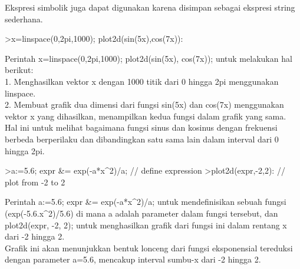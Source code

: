 \documentclass{article}
\begin{document}
\begin{eulernotebook}
\begin{eulercomment}
\begin{eulercomment}
\begin{eulercomment}
\begin{eulercomment}
\begin{eulercomment}
Ekspresi simbolik juga dapat digunakan karena disimpan sebagai
ekspresi string sederhana.
\end{eulercomment}
\begin{eulerprompt}
>x=linspace(0,2pi,1000); plot2d(sin(5x),cos(7x)):
\end{eulerprompt}
\begin{eulercomment}
Perintah x=linspace(0,2pi,1000); plot2d(sin(5x), cos(7x)); untuk
melakukan hal berikut:\\
1. Menghasilkan vektor x dengan 1000 titik dari 0 hingga 2pi
menggunakan linspace.\\
2. Membuat grafik dua dimensi dari fungsi sin(5x) dan cos(7x)
menggunakan vektor x yang dihasilkan, menampilkan kedua fungsi dalam
grafik yang sama.\\
Hal ini untuk melihat bagaimana fungsi sinus dan kosinus dengan
frekuensi berbeda berperilaku dan dibandingkan satu sama lain dalam
interval dari 0 hingga 2pi.
\end{eulercomment}
\begin{eulerprompt}
>a:=5.6; expr &= exp(-a*x^2)/a; // define expression
>plot2d(expr,-2,2): // plot from -2 to 2
\end{eulerprompt}
\begin{eulercomment}
Perintah a:=5.6; expr \&= exp(-a*x\textasciicircum{}2)/a; untuk mendefinisikan sebuah
fungsi (exp(-5.6.x\textasciicircum{}2)/5.6) di mana a adalah parameter dalam fungsi
tersebut, dan plot2d(expr, -2, 2); untuk menghasilkan grafik dari
fungsi ini dalam rentang x dari -2 hingga 2.\\
Grafik ini akan menunjukkan bentuk lonceng dari fungsi eksponensial
tereduksi dengan parameter a=5.6, mencakup interval sumbu-x dari -2
hingga 2.


\end{eulercomment}
\end{eulercomment}
\end{eulercomment}
\end{eulercomment}
\end{eulercomment}
\end{eulernotebook}
\end{document}
